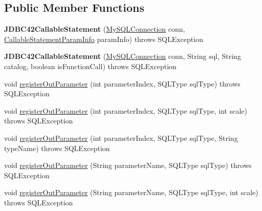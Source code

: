 \subsection*{Public Member Functions}
\begin{DoxyCompactItemize}
\item 
\mbox{\label{classcom_1_1mysql_1_1jdbc_1_1_j_d_b_c42_callable_statement_a60f1e70610654a170a165813fc7c01db}} 
{\bfseries J\+D\+B\+C42\+Callable\+Statement} (\mbox{\hyperlink{interfacecom_1_1mysql_1_1jdbc_1_1_my_s_q_l_connection}{My\+S\+Q\+L\+Connection}} conn, \mbox{\hyperlink{classcom_1_1mysql_1_1jdbc_1_1_callable_statement_1_1_callable_statement_param_info}{Callable\+Statement\+Param\+Info}} param\+Info)  throws S\+Q\+L\+Exception 
\item 
\mbox{\label{classcom_1_1mysql_1_1jdbc_1_1_j_d_b_c42_callable_statement_a2431bfc4a4b79bfefeea7805048bff53}} 
{\bfseries J\+D\+B\+C42\+Callable\+Statement} (\mbox{\hyperlink{interfacecom_1_1mysql_1_1jdbc_1_1_my_s_q_l_connection}{My\+S\+Q\+L\+Connection}} conn, String sql, String catalog, boolean is\+Function\+Call)  throws S\+Q\+L\+Exception 
\item 
void \mbox{\hyperlink{classcom_1_1mysql_1_1jdbc_1_1_j_d_b_c42_callable_statement_ac9e4f6e99edd718c7943741747c44e67}{register\+Out\+Parameter}} (int parameter\+Index, S\+Q\+L\+Type sql\+Type)  throws S\+Q\+L\+Exception 
\item 
void \mbox{\hyperlink{classcom_1_1mysql_1_1jdbc_1_1_j_d_b_c42_callable_statement_a316397da97ae5879a951f3293a112e1d}{register\+Out\+Parameter}} (int parameter\+Index, S\+Q\+L\+Type sql\+Type, int scale)  throws S\+Q\+L\+Exception 
\item 
void \mbox{\hyperlink{classcom_1_1mysql_1_1jdbc_1_1_j_d_b_c42_callable_statement_a6e026485ede4e20a6916205cfd938fea}{register\+Out\+Parameter}} (int parameter\+Index, S\+Q\+L\+Type sql\+Type, String type\+Name)  throws S\+Q\+L\+Exception 
\item 
void \mbox{\hyperlink{classcom_1_1mysql_1_1jdbc_1_1_j_d_b_c42_callable_statement_a4b9291fc4ec568b35a8989bd7b909f98}{register\+Out\+Parameter}} (String parameter\+Name, S\+Q\+L\+Type sql\+Type)  throws S\+Q\+L\+Exception 
\item 
void \mbox{\hyperlink{classcom_1_1mysql_1_1jdbc_1_1_j_d_b_c42_callable_statement_af5029d4963090b6e9e479a7c3909fd19}{register\+Out\+Parameter}} (String parameter\+Name, S\+Q\+L\+Type sql\+Type, int scale)  throws S\+Q\+L\+Exception 

\end{DoxyCompactItemize}
